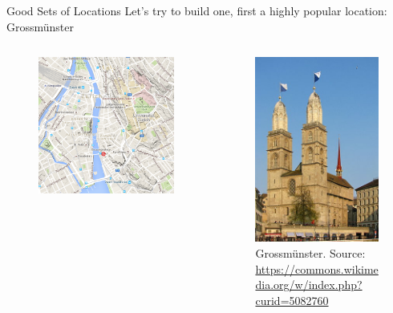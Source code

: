 \documentclass{beamer}
\begin{document}
\begin{frame}{Good Sets of Locations}
  Let's try to build one, first a highly popular location: Grossmünster
  \begin{columns}
    \begin{column}{0.5\textwidth}
      \begin{figure}
        \centering
        \includegraphics[width=\textwidth]{diversity_set_1}
      \end{figure}
    \end{column}
    \begin{column}{0.5\textwidth}
      \begin{figure}
        \centering
        \includegraphics[width=.5\textwidth]{grossmunster}
        \caption{Grossmünster. Source: \url{https://commons.wikimedia.org/w/index.php?curid=5082760}}
      \end{figure}
    \end{column}
  \end{columns}
\end{frame}
\end{document}

